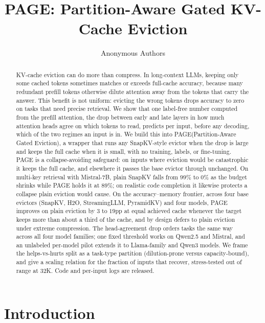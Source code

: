 \documentclass{article}
\title{PAGE: Partition-Aware Gated KV-Cache Eviction}
\author{%
  Anonymous Authors%
}
\newcommand{\method}{PAGE\xspace}
\begin{document}
\maketitle

\begin{abstract}
KV-cache eviction can do more than compress. In long-context LLMs, keeping only
some cached tokens sometimes matches or exceeds full-cache accuracy, because
many redundant prefill tokens otherwise dilute attention away from the tokens
that carry the answer. This benefit is not uniform: evicting the wrong tokens
drops accuracy to zero on tasks that need precise retrieval. We show that one
label-free number computed from the prefill attention, the drop between early
and late layers in how much attention heads agree on which tokens to read,
predicts per input, before any decoding, which of the two regimes an input is
in. We build this into \method (Partition-Aware Gated Eviction), a wrapper that
runs any SnapKV-style evictor when the drop is large and keeps the full cache
when it is small, with no training, labels, or fine-tuning. \method is a
collapse-avoiding safeguard: on inputs where eviction would be catastrophic it
keeps the full cache, and elsewhere it passes the base evictor through unchanged. On
multi-key retrieval with Mistral-7B, plain SnapKV falls from $99\%$ to $0\%$ as
the budget shrinks while \method holds it at $89\%$; on realistic code
completion it likewise protects a collapse plain eviction would cause. On the accuracy--memory
frontier, across four base evictors (SnapKV, H2O, StreamingLLM, PyramidKV) and
four models, \method improves on plain eviction by $3$ to $19$pp at equal
achieved cache whenever the target keeps more than about a third of the cache,
and by design defers to plain eviction under extreme compression. The
head-agreement drop orders tasks the same way across all four model families;
one fixed threshold works on Qwen2.5 and Mistral, and an unlabeled per-model
pilot extends it to Llama-family and Qwen3 models. We frame the helps-vs-hurts
split as a task-type partition (dilution-prone versus
capacity-bound), and give a scaling relation for the fraction of inputs that
recover, stress-tested out of range at 32K. Code and per-input logs are
released.
\end{abstract}

\section{Introduction}
\label{sec:intro}
\end{document}
